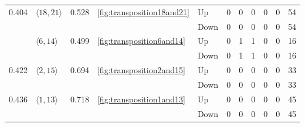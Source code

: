 \documentclass{article}
\begin{document}
\begin{center}
\begin{tabular}{lllllrrrrrr}
\cline{1-11} \cline{2-11} \cline{3-11} \cline{4-11}
\multirow[t]{4}{*}{0.404} & \multirow[t]{2}{*}{$\langle18, 21\rangle$} & \multirow[t]{2}{*}{0.528} & \multirow[t]{2}{*}{\ref{fig:transposition18and21}} & Up & 0 & 0 & 0 & 0 & 0 & 54 \\
 &  &  &  & Down & 0 & 0 & 0 & 0 & 0 & 54 \\
\cline{2-11} \cline{3-11} \cline{4-11}
 & \multirow[t]{2}{*}{$\langle6, 14\rangle$} & \multirow[t]{2}{*}{0.499} & \multirow[t]{2}{*}{\ref{fig:transposition6and14}} & Up & 0 & 1 & 1 & 0 & 0 & 16 \\
 &  &  &  & Down & 0 & 1 & 1 & 0 & 0 & 16 \\
\cline{1-11} \cline{2-11} \cline{3-11} \cline{4-11}
\multirow[t]{2}{*}{0.422} & \multirow[t]{2}{*}{$\langle2, 15\rangle$} & \multirow[t]{2}{*}{0.694} & \multirow[t]{2}{*}{\ref{fig:transposition2and15}} & Up & 0 & 0 & 0 & 0 & 0 & 33 \\
 &  &  &  & Down & 0 & 0 & 0 & 0 & 0 & 33 \\
\cline{1-11} \cline{2-11} \cline{3-11} \cline{4-11}
\multirow[t]{2}{*}{0.436} & \multirow[t]{2}{*}{$\langle1, 13\rangle$} & \multirow[t]{2}{*}{0.718} & \multirow[t]{2}{*}{\ref{fig:transposition1and13}} & Up & 0 & 0 & 0 & 0 & 0 & 45 \\
 &  &  &  & Down & 0 & 0 & 0 & 0 & 0 & 45 \\
\cline{1-11} \cline{2-11} \cline{3-11} \cline{4-11}
\bottomrule
\end{tabular}


\end{center}
\end{document}
